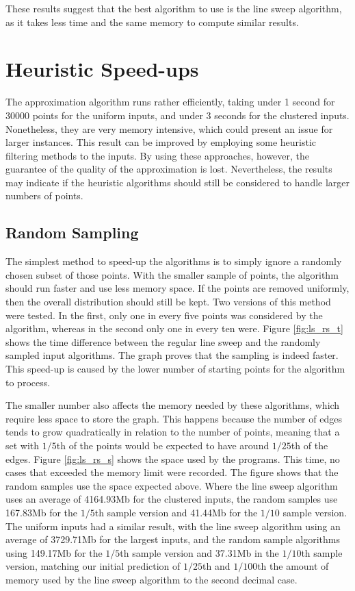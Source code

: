 These results suggest that the best algorithm to use is the line sweep algorithm, as it takes less time and the same memory to compute similar results.
	
\section{Heuristic Speed-ups}
The approximation algorithm runs rather efficiently, taking under 1 second for 30000 points for the uniform inputs, and under 3 seconds for the clustered inputs. Nonetheless, they are very memory intensive, which could present an issue for larger instances. This result can be improved by employing some heuristic filtering methods to the inputs. By using these approaches, however, the guarantee of the quality of the approximation is lost. Nevertheless, the results may indicate if the heuristic algorithms should still be considered to handle larger numbers of points.

\subsection{Random Sampling}
The simplest method to speed-up the algorithms is to simply ignore a randomly chosen subset of those points. With the smaller sample of points, the algorithm should run faster and use less memory space. If the points are removed uniformly, then the overall distribution should still be kept. Two versions of this method were tested. In the first, only one in every five points was considered by the algorithm, whereas in the second only one in every ten were. Figure \ref{fig:ls_rs_t} shows the time difference between the regular line sweep and the randomly sampled input algorithms.
The graph proves that the sampling is indeed faster. This speed-up is caused by the lower number of starting points for the algorithm to process. 

The smaller number also affects the memory needed by these algorithms, which require less space to store the graph. This happens because the number of edges tends to grow quadratically in relation to the number of points, meaning that a set with $1/5$th of the points would be expected to have around $1/25$th of the edges. Figure \ref{fig:ls_rs_s} shows the space used by the programs. This time, no cases that exceeded the memory limit were recorded. The figure shows that the random samples use the space expected above. Where the line sweep algorithm uses an average of 4164.93Mb for the clustered inputs, the random samples use 167.83Mb for the $1/5$th sample version and 41.44Mb for the $1/10$ sample version. The uniform inputs had a similar result, with the line sweep algorithm using an average of 3729.71Mb for the largest inputs, and the random sample algorithms using 149.17Mb for the $1/5$th sample version and 37.31Mb in the $1/10$th sample version, matching our initial prediction of $1/25$th and $1/100$th the amount of memory used by the line sweep algorithm to the second decimal case. 

